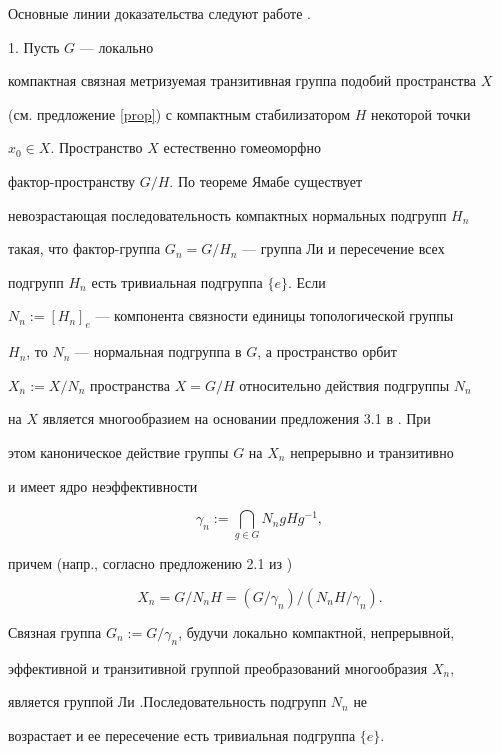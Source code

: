\begin{pf}


Основные линии доказательства следуют работе \cite{B3}.





1. Пусть $G$ --- локально


компактная связная метризуемая транзитивная группа подобий пространства $X$


(см. предложение \ref{prop}) с компактным стабилизатором $H$ некоторой точки


$x_{0}\in X$. Пространство $X$ естественно гомеоморфно


фактор-пространству $G/H$. По теореме Ямабе \cite{Y} существует


невозрастающая последовательность компактных нормальных подгрупп $H_{n}$


такая, что фактор-группа $G_{n}=G/H_{n}$ --- группа Ли и пересечение всех


подгрупп $H_{n}$ есть тривиальная подгруппа $\{e\}$. Если


$N_{n}:=[H_{n}]_{e}$ --- компонента связности единицы топологической группы


$H_{n}$, то $N_{n}$ --- нормальная подгруппа в $G$, а пространство орбит


$X_{n}:=X/N_{n}$ пространства $X=G/H$ относительно действия подгруппы $N_{n}$


на $X$ является многообразием на основании предложения 3.1 в \cite{B3}. При


этом каноническое действие группы $G$ на $X_{n}$ непрерывно и транзитивно


и имеет ядро неэффективности


$$


\gamma_{n}:=\bigcap_{g \in G}N_{n}gHg^{-1},


$$


причем (напр., согласно предложению 2.1 из \cite{B3})


$$


X_{n}=G/N_{n}H=(G/\gamma_{n})/(N_{n}H/\gamma_{n}).


$$


Связная группа $G_{n}:=G/\gamma_{n}$, будучи локально компактной, непрерывной,


эффективной и транзитивной группой преобразований многообразия $X_{n}$,


является группой Ли \cite{Sz}.Последовательность подгрупп $N_{n}$ не


возрастает и ее пересечение есть тривиальная подгруппа $\{e\}$.



\end{pf}
